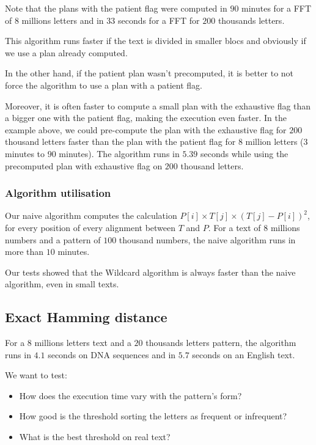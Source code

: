 \documentclass[preprint,12pt]{elsarticle}
\begin{document}
Note that the plans with the patient flag were computed in
$90$ minutes for a FFT of $8$ millions letters
and in $33$ seconds for a FFT for $200$ thousands letters.

This algorithm runs faster if the text is divided in smaller blocs
and obviously if we use a plan already computed.

In the other hand, if the patient plan wasn't precomputed,
it is better to not force the algorithm to use a plan with a patient flag.

Moreover, it is often faster to compute a small plan with the exhaustive flag
than a bigger one with the patient flag, making the execution even faster.
In the example above, we could pre-compute the plan
with the exhaustive flag for $200$ thousand letters faster than
the plan with the patient flag for $8$ million letters ($3$ minutes to $90$ minutes).
The algorithm runs in $5.39$ seconds while using the precomputed plan with exhaustive flag
on $200$ thousand letters.

\subsubsection*{Algorithm utilisation}

Our naive algorithm computes the calculation $P[i] \times T[j] \times (T[j]-P[i])^2$,
for every position of every alignment between $T$ and $P$.
For a text of $8$ millions numbers and a pattern of $100$ thousand numbers,
the naive algorithm runs in more than $10$ minutes.

Our tests showed that the Wildcard algorithm is always faster than the naive algorithm, even in small texts.





\subsection{Exact Hamming distance}


For a $8$ millions letters text and a $20$ thousands letters pattern, 
the algorithm runs in $4.1$ seconds on DNA sequences and in $5.7$ seconds on an English text.

We want to test:
\begin{itemize}
\setlength\itemsep{-0.4em}
\item How does the execution time vary with the pattern's form?
\item How good is the threshold sorting the letters as frequent or infrequent?
\item What is the best threshold on real text?
\end{itemize}
\end{document}
